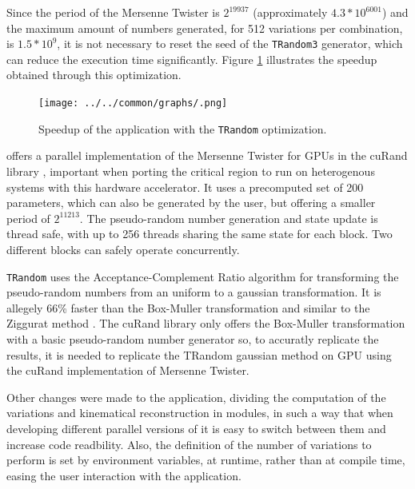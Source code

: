 Since the period of the Mersenne Twister is $2^{19937}$ (approximately $4.3 * 10^{6001}$) and the maximum amount of numbers generated, for 512 variations per combination, is $1.5 * 10^{9}$, it is not necessary to reset the seed of the \texttt{TRandom3} generator, which can reduce the \ttDilepKinFit execution time significantly. Figure \ref{fig:TRandomOptim} illustrates the speedup obtained through this optimization.

\begin{figure}[!htp]
	\begin{center}
		\texttt{[image: ../../common/graphs/.png]}  
		\caption{Speedup of the \tth application with the \texttt{TRandom} optimization.}
		\label{fig:TRandomOptim}
	\end{center}
\end{figure}

\nvidia offers a parallel implementation of the Mersenne Twister for GPUs \cite{NVIDIA:MersenneTwister} in the cuRand library \cite{NVIDIA:cuRand}, important when porting the critical region to run on heterogenous systems with this hardware accelerator. It uses a precomputed set of 200 parameters, which can also be generated by the user, but offering a smaller period of $2^{11213}$. The pseudo-random number generation and state update is thread safe, with up to 256 threads sharing the same state for each block. Two different blocks can safely operate concurrently.

\texttt{TRandom} uses the Acceptance-Complement Ratio algorithm \cite{AcceptanceRandom} for transforming the pseudo-random numbers from an uniform to a gaussian transformation. It is allegely 66\% faster than the Box-Muller transformation \cite{BoxMuller} and similar to the Ziggurat method \cite{Ziggurat}. The cuRand library only offers the Box-Muller transformation with a basic pseudo-random number generator so, to accuratly replicate the results, it is needed to replicate the TRandom gaussian method on GPU using the cuRand implementation of Mersenne Twister.

Other changes were made to the application, dividing the computation of the variations and kinematical reconstruction in modules, in such a way that when developing different parallel versions of \ttDilepKinFit it is easy to switch between them and increase code readbility. Also, the definition of the number of variations to perform is set by environment variables, at runtime, rather than at compile time, easing the user interaction with the application.
